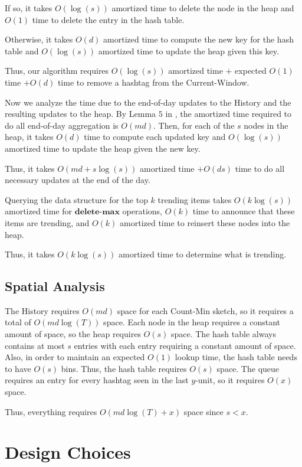 \documentclass[twoside]{article}
\newcommand{\cc}[1]
 {\textbf{\cite{#1}}}
\begin{document}
{If so, it takes $O(\log(s))$ amortized time to delete the node in the heap and $O(1)$ time to delete the entry in the hash table.

Otherwise, it takes $O(d)$ amortized time to compute the new key for the hash table and $O(\log(s))$ amortized time to update the heap given this key.

Thus, our algorithm requires $O(\log(s))$ amortized time $+$ expected $O(1)$ time  $+ O(d)$ time to remove a hashtag from the Current-Window.

Now we analyze the time due to the end-of-day updates to the History and the resulting updates to the heap. By Lemma $5$ in \cc{Matusevych:2012}, the amortized time required to do all end-of-day aggregation is $O(md)$. Then, for each of the $s$ nodes in the heap, it takes $O(d)$ time to compute each updated key and $O(\log(s))$ amortized time to update the heap given the new key.

Thus, it takes $O(md + s\log(s))$ amortized time $+ O(ds)$ time to do all necessary updates at the end of the day.

Querying the data structure for the top $k$ trending items takes $O(k\log(s))$ amortized time for $\textbf{delete-max}$ operations, $O(k)$ time to announce that these items are trending, and $O(k)$ amortized time to reinsert these nodes into the heap.

Thus, it takes $O(k\log(s))$ amortized time to determine what is trending.


\subsection{Spatial Analysis}

The History requires $O(md)$ space for each Count-Min sketch, so it requires a total of $O(md\log(T))$ space.
Each node in the heap requires a constant amount of space, so the heap requires $O(s)$ space.
The hash table always contains at most $s$ entries with each entry requiring a constant amount of space.  Also, in order to maintain an expected $O(1)$ lookup time, the hash table needs to have $O(s)$ bins.  Thus, the hash table requires $O(s)$ space.
The queue requires an entry for every hashtag seen in the last $y$-unit, so it requires $O(x)$ space.

Thus, everything requires $O(md\log(T) + x)$ space since $s < x$.


\section{Design Choices}

}
\end{document}
